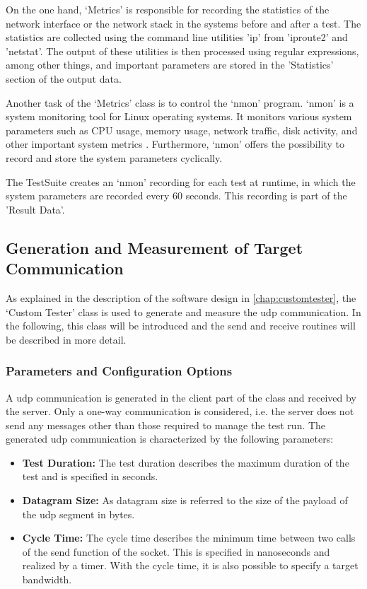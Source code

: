 On the one hand, `Metrics' is responsible for recording the statistics of the network interface or the network stack in the systems before and after a test. The statistics are collected using the command line utilities 'ip' from 'iproute2' and 'netstat'. The output of these utilities is then processed using regular expressions, among other things, and important parameters are stored in the 'Statistics' section of the output data.

Another task of the `Metrics' class is to control the `nmon' program. `nmon' is a system monitoring tool for Linux operating systems. It monitors various system parameters such as \ac{CPU} usage, memory usage, network traffic, disk activity, and other important system metrics \cite{tsd04}. Furthermore, `nmon' offers the possibility to record and store the system parameters cyclically.

The TestSuite creates an `nmon' recording for each test at runtime, in which the system parameters are recorded every 60 seconds. This recording is part of the 'Result Data'.

\subsection{Generation and Measurement of Target Communication} \label{chap:targetcom}
As explained in the description of the software design in \ref{chap:customtester}, the `Custom Tester' class is used to generate and measure the \ac{udp} communication.  In the following, this class will be introduced and the send and receive routines will be described in more detail.

\subsubsection{Parameters and Configuration Options}
A \ac{udp} communication is generated in the client part of the class and received by the server. Only a one-way communication is considered, i.e. the server does not send any messages other than those required to manage the test run. The generated \ac{udp} communication is characterized by the following parameters:

\begin{itemize}
	\item \textbf{Test Duration:} The test duration describes the maximum duration of the test and is specified in seconds.
	\item \textbf{Datagram Size:} As datagram size is referred to the size of the payload of the \ac{udp} segment in bytes.
	\item \textbf{Cycle Time:} The cycle time describes the minimum time between two calls of the send function of the socket. This is specified in nanoseconds and realized by a timer. With the cycle time, it is also possible to specify a target bandwidth.
\end{itemize}

